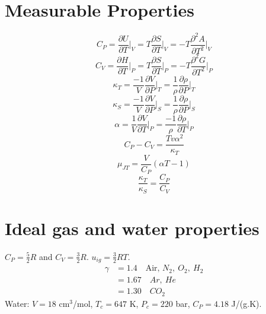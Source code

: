 \documentclass[a4paper,11pt]{article}
\begin{document}
\begin{multicols}{2}
\section{Measurable Properties}
\begin{equation}\label{eq:Cp}
	C_P = \frac{\partial U}{\partial T}\bigg|_V = T\frac{\partial S}{\partial T}\bigg|_V = -T\frac{\partial^2 A}{\partial T^2}\bigg|_V
\end{equation}
\begin{equation}\label{eq:Cv}
	C_V = \frac{\partial H}{\partial T}\bigg|_P = T\frac{\partial S}{\partial T}\bigg|_P = -T\frac{\partial^2 G}{\partial T^2}\bigg|_P
\end{equation}
\begin{equation}\label{eq:kappat}
	\kappa_T = \frac{-1}{V}\frac{\partial V}{\partial P}\bigg|_T = \frac{1}{\rho}\frac{\partial \rho}{\partial P}\bigg|_T
\end{equation}
\begin{equation}\label{eq:kappas}
	\kappa_S = \frac{-1}{V}\frac{\partial V}{\partial P}\bigg|_S = \frac{1}{\rho}\frac{\partial \rho}{\partial P}\bigg|_S
\end{equation}
\begin{equation}\label{eq:alpha}
	\alpha = \frac{1}{V}\frac{\partial V}{\partial T}\bigg|_P = \frac{-1}{\rho}\frac{\partial \rho}{\partial T}\bigg|_P
\end{equation}
\begin{equation}\label{eq:cp-cv}
	C_P - C_V = \frac{Tv\alpha^2}{\kappa_T}
\end{equation}
\begin{equation}\label{eq:jtcoeff}
	\mu_{JT} = \frac{V}{C_P}(\alpha T - 1)
\end{equation}
\begin{equation}
	\frac{\kappa_T}{\kappa_S} = \frac{C_P}{C_V}
\end{equation}

\section{Ideal gas and water properties}
$C_P = \tfrac{5}{2}R$ and $C_V = \tfrac{3}{2}R$. $u_{ig} = \tfrac{3}{2}RT$.
\begin{subequations}
	\begin{align*}
		\gamma &= 1.4\quad \text{Air, }N_2,\ O_2,\ H_2\\
		&= 1.67\quad Ar,\ He\\
		&= 1.30\quad CO_2
	\end{align*}
\end{subequations}
Water: $V=18$ cm$^3$/mol, $T_c=647$ K, $P_c=220$ bar, $C_P=4.18$ J/(g.K).


\end{multicols}
\end{document}
